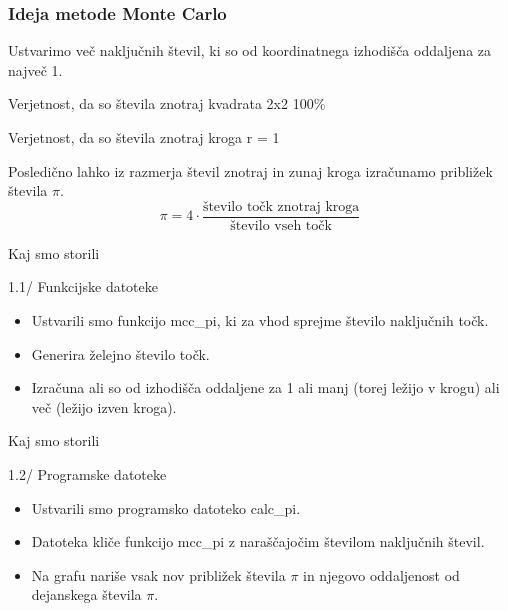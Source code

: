 \documentclass{beamer}
\begin{document}
\begin{frame}
\frametitle{Ideja metode Monte Carlo}
Ustvarimo več naključnih števil, ki so od koordinatnega izhodišča oddaljena za največ 1.
        \begin{block}{Verjetnost, da so števila znotraj kvadrata 2x2}
        100\%
        \end{block}
        \begin{block}{Verjetnost, da so števila znotraj kroga r = 1}
        \end{block}
        \begin{block}{Posledično lahko iz razmerja števil znotraj in zunaj kroga izračunamo približek števila $\pi$.}
        \Large
        \[ \pi = 4\cdot \frac{\text{število točk znotraj kroga}}{\text{število vseh točk}} \]
        
        \end{block}
        
\end{frame}



\begin{frame}{Kaj smo storili}
\begin{block}{1.1/ Funkcijske datoteke}
\begin{itemize}
\item Ustvarili smo funkcijo mcc\_pi, ki za vhod sprejme število naključnih točk.
\pause
\item Generira želejno število točk.
\pause
\item Izračuna ali so od izhodišča oddaljene za 1 ali manj (torej ležijo v krogu) ali več (ležijo izven kroga).
\end{itemize}    
\end{block}   
\end{frame}

\begin{frame}{Kaj smo storili}
\begin{block}{1.2/ Programske datoteke}
\begin{itemize}
\item Ustvarili smo programsko datoteko calc\_pi.
\pause
\item Datoteka kliče funkcijo mcc\_pi z naraščajočim številom naključnih števil.
\pause
\item Na grafu nariše vsak nov približek števila $\pi$ in njegovo oddaljenost od dejanskega števila $\pi$.
\end{itemize}
\end{block}
\end{frame}
\end{document}
